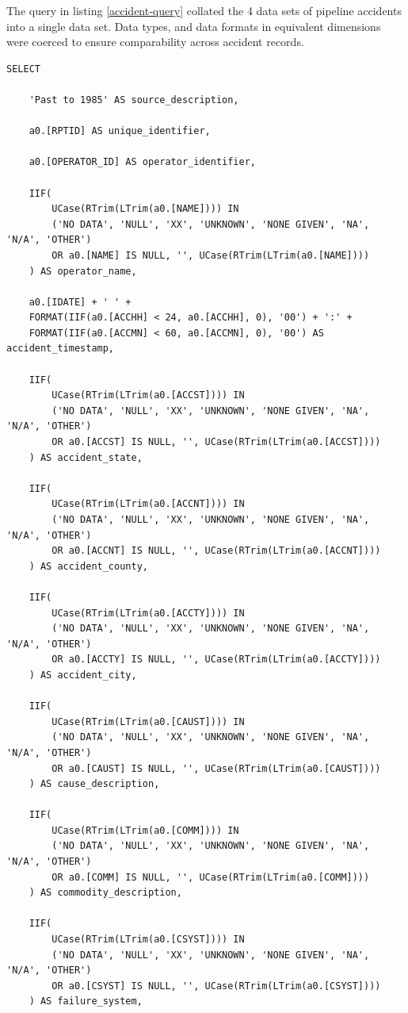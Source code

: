 \documentclass[letterpaper,10pt,oneside,final,onecolumn]{article}
\begin{document}
	The query in listing \ref{accident-query} collated the 4 data sets of pipeline accidents into a single data set. 
	Data types, and data formats in equivalent dimensions were coerced to ensure comparability across accident records.

	\begin{lstlisting}[label=accident-query,caption={\textit{JetSQL} statement to collate pipeline accidents into a single data set}]
SELECT

	'Past to 1985' AS source_description,

	a0.[RPTID] AS unique_identifier,

	a0.[OPERATOR_ID] AS operator_identifier,

	IIF(
		UCase(RTrim(LTrim(a0.[NAME]))) IN
		('NO DATA', 'NULL', 'XX', 'UNKNOWN', 'NONE GIVEN', 'NA', 'N/A', 'OTHER')
		OR a0.[NAME] IS NULL, '', UCase(RTrim(LTrim(a0.[NAME])))
	) AS operator_name,

	a0.[IDATE] + ' ' + 
	FORMAT(IIF(a0.[ACCHH] < 24, a0.[ACCHH], 0), '00') + ':' +
	FORMAT(IIF(a0.[ACCMN] < 60, a0.[ACCMN], 0), '00') AS accident_timestamp,

	IIF(
		UCase(RTrim(LTrim(a0.[ACCST]))) IN
		('NO DATA', 'NULL', 'XX', 'UNKNOWN', 'NONE GIVEN', 'NA', 'N/A', 'OTHER')
		OR a0.[ACCST] IS NULL, '', UCase(RTrim(LTrim(a0.[ACCST])))
	) AS accident_state,

	IIF(
		UCase(RTrim(LTrim(a0.[ACCNT]))) IN
		('NO DATA', 'NULL', 'XX', 'UNKNOWN', 'NONE GIVEN', 'NA', 'N/A', 'OTHER')
		OR a0.[ACCNT] IS NULL, '', UCase(RTrim(LTrim(a0.[ACCNT])))
	) AS accident_county,

	IIF(
		UCase(RTrim(LTrim(a0.[ACCTY]))) IN
		('NO DATA', 'NULL', 'XX', 'UNKNOWN', 'NONE GIVEN', 'NA', 'N/A', 'OTHER')
		OR a0.[ACCTY] IS NULL, '', UCase(RTrim(LTrim(a0.[ACCTY])))
	) AS accident_city,

	IIF(
		UCase(RTrim(LTrim(a0.[CAUST]))) IN
		('NO DATA', 'NULL', 'XX', 'UNKNOWN', 'NONE GIVEN', 'NA', 'N/A', 'OTHER')
		OR a0.[CAUST] IS NULL, '', UCase(RTrim(LTrim(a0.[CAUST])))
	) AS cause_description,

	IIF(
		UCase(RTrim(LTrim(a0.[COMM]))) IN
		('NO DATA', 'NULL', 'XX', 'UNKNOWN', 'NONE GIVEN', 'NA', 'N/A', 'OTHER')
		OR a0.[COMM] IS NULL, '', UCase(RTrim(LTrim(a0.[COMM])))
	) AS commodity_description,

	IIF(
		UCase(RTrim(LTrim(a0.[CSYST]))) IN
		('NO DATA', 'NULL', 'XX', 'UNKNOWN', 'NONE GIVEN', 'NA', 'N/A', 'OTHER')
		OR a0.[CSYST] IS NULL, '', UCase(RTrim(LTrim(a0.[CSYST])))
	) AS failure_system,


\end{lstlisting}
\end{document}
